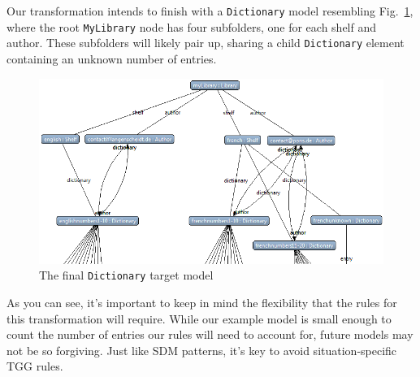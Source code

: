 \newpage

Our transformation intends to finish with a \texttt{Dictionary} model resembling Fig.~\ref{eclipse:dictionaryStart}, where the root \texttt{MyLibrary} node has
four subfolders, one for each shelf and author. These subfolders will likely pair up, sharing a child \texttt{Dictionary} element containing an unknown number
of entries.

\vspace{1cm}

\begin{figure}[htbp]
\hspace{-1.5cm}
    \includegraphics[width=1.2\textwidth]{eclipse_DictionaryResultMetamodel}
 	\caption{The final \texttt{Dictionary} target model}
 	\label{eclipse:dictionaryStart}
\end{figure}

\vspace{1cm}

As you can see, it's important to keep in mind the flexibility that the rules for this transformation will require. While our example model is small
enough to count the number of entries our rules will need to account for, future models may not be so forgiving. Just like SDM patterns, it's key to avoid
situation-specific TGG rules.







